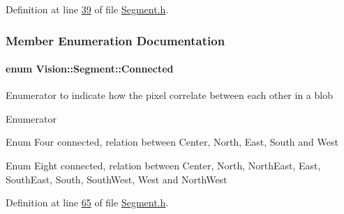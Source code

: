 Definition at line \hyperlink{_segment_8h_source_l00039}{39} of file \hyperlink{_segment_8h_source}{Segment.\+h}.



\subsubsection{Member Enumeration Documentation}
\hypertarget{class_vision_1_1_segment_a330240c08320e72270fac0aa83d5e27e}{}
\paragraph[{Connected}]{\setlength{\rightskip}{0pt plus 5cm}enum {\bf Vision\+::\+Segment\+::\+Connected}}\label{class_vision_1_1_segment_a330240c08320e72270fac0aa83d5e27e}
Enumerator to indicate how the pixel correlate between each other in a blob \begin{Desc}
\item[Enumerator]\par
\begin{description}
\item[{\em 
\hypertarget{class_vision_1_1_segment_a330240c08320e72270fac0aa83d5e27ea1fca5ab1c285c0edd2bdc3072cab0c01}{}Four\label{class_vision_1_1_segment_a330240c08320e72270fac0aa83d5e27ea1fca5ab1c285c0edd2bdc3072cab0c01}
}]Enum Four connected, relation between Center, North, East, South and West \item[{\em 
\hypertarget{class_vision_1_1_segment_a330240c08320e72270fac0aa83d5e27eae8e2b0fa6d15448f10cddc0390284a39}{}Eight\label{class_vision_1_1_segment_a330240c08320e72270fac0aa83d5e27eae8e2b0fa6d15448f10cddc0390284a39}
}]Enum Eight connected, relation between Center, North, North\+East, East, South\+East, South, South\+West, West and North\+West \end{description}
\end{Desc}


Definition at line \hyperlink{_segment_8h_source_l00065}{65} of file \hyperlink{_segment_8h_source}{Segment.\+h}.

\hypertarget{class_vision_1_1_segment_af3a2b992526eac54bca53e34cf2db4da}{}

